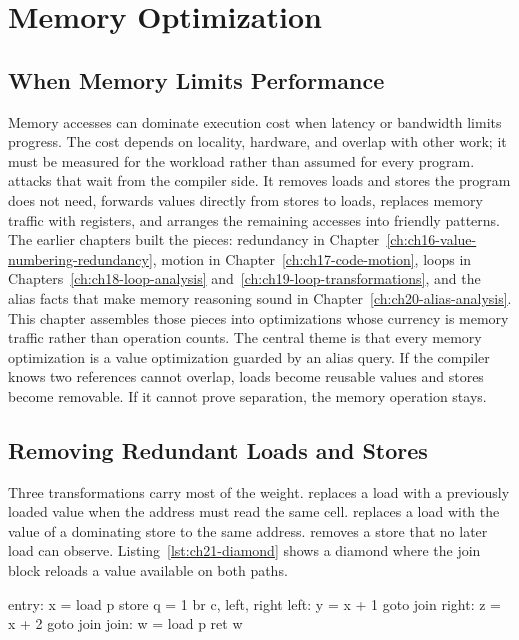 \chapter{Memory Optimization}
\label{ch:ch21-memory-optimization}

\section{When Memory Limits Performance}
\label{sec:ch21-bottleneck}

Memory accesses can dominate execution cost when latency or bandwidth limits progress.
The cost depends on locality, hardware, and overlap with other work; it must be measured for the workload rather than assumed for every program.
 attacks that wait from the compiler side.
It removes loads and stores the program does not need, forwards values directly from stores to loads, replaces memory traffic with registers, and arranges the remaining accesses into friendly patterns.
The earlier chapters built the pieces: redundancy in Chapter~\ref{ch:ch16-value-numbering-redundancy}, motion in Chapter~\ref{ch:ch17-code-motion}, loops in Chapters~\ref{ch:ch18-loop-analysis} and~\ref{ch:ch19-loop-transformations}, and the alias facts that make memory reasoning sound in Chapter~\ref{ch:ch20-alias-analysis}.
This chapter assembles those pieces into optimizations whose currency is memory traffic rather than operation counts.
The central theme is that every memory optimization is a value optimization guarded by an alias query.
If the compiler knows two references cannot overlap, loads become reusable values and stores become removable.
If it cannot prove separation, the memory operation stays.

\section{Removing Redundant Loads and Stores}
\label{sec:ch21-redundant-accesses}

Three transformations carry most of the weight.
 replaces a load with a previously loaded value when the address must read the same cell.
 replaces a load with the value of a dominating store to the same address.
 removes a store that no later load can observe.
Listing~\ref{lst:ch21-diamond} shows a diamond where the join block reloads a value available on both paths.

\begin{irlisting}[caption={A diamond where the join repeats a load from before the branch.},label={lst:ch21-diamond}]
entry: x = load p
       store q = 1
       br c, left, right
left:  y = x + 1
       goto join
right: z = x + 2
       goto join
join:  w = load p
       ret w
\end{irlisting}

